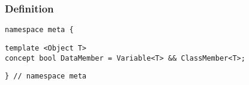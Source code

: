 
\subsubsection{Definition}

\begin{verbatim}
namespace meta {
\end{verbatim}
\begin{verbatim}
template <Object T>
concept bool DataMember = Variable<T> && ClassMember<T>;

\end{verbatim}
\begin{verbatim}
} // namespace meta
\end{verbatim}
